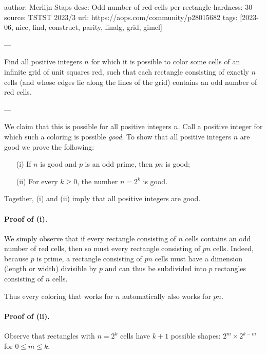 author: Merlijn Staps
desc: Odd number of red cells per rectangle
hardness: 30
source: TSTST 2023/3
url: https://aops.com/community/p28015682
tags: [2023-06, nice, find, construct, parity, linalg, grid, gimel]

---

Find all positive integers $n$ for which it is possible to color some cells of
an infinite grid of unit squares red, such that each rectangle consisting of
exactly $n$ cells (and whose edges lie along the lines of the grid) contains
an odd number of red cells.

---

We claim that this is possible for all positive integers $n$. Call a positive integer for which such a coloring is possible \emph{good}. To show that all positive integers $n$ are good we prove the following:
\begin{itemize}
\item[(i)] If $n$ is good and $p$ is an odd prime, then $pn$ is good;
\item[(ii)] For every $k \ge 0$, the number $n=2^k$ is good.
\end{itemize}
Together, (i) and (ii) imply that all positive integers are good.

\paragraph{Proof of (i).}
We simply observe that if every rectangle consisting of $n$ cells contains an
odd number of red cells, then so must every rectangle consisting of $pn$ cells.
Indeed, because $p$ is prime, a rectangle consisting of $pn$ cells must have a
dimension (length or width) divisible by $p$ and can thus be subdivided
into $p$ rectangles consisting of $n$ cells.

Thus every coloring that works for $n$ automatically also works for $pn$.

\paragraph{Proof of (ii).}
Observe that rectangles with $n=2^k$ cells have $k+1$ possible shapes:
$2^m\times 2^{k-m}$ for $0\leq m \leq k$.

